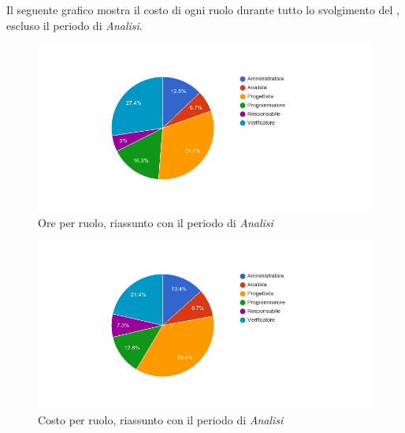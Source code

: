 Il seguente grafico mostra il costo di ogni ruolo durante tutto lo svolgimento del , escluso il periodo di \textit{Analisi}.

\begin{figure}[H]
  \begin{center}
    \includegraphics[width=15cm]{res/img/prospettoEconomico/orePerRuoloRiassuntoConAnalisi.png}
  \caption{Ore per ruolo, riassunto  con il periodo di \textit{Analisi}}
  \end{center} 
\end{figure}  

\begin{figure}[H]
  \begin{center}
    \includegraphics[width=15cm]{res/img/prospettoEconomico/costoPerRuoloRiassuntoConAnalisi.png}
  \caption{Costo per ruolo, riassunto  con il periodo di \textit{Analisi}}
  \end{center} 
\end{figure}  


